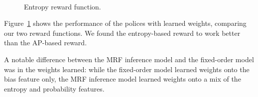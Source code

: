 \begin{figure}[h!]
\centering
{} \\
  \caption{Entropy reward function.}
  \label{fig:results_entropy}
\end{figure}

Figure~\ref{fig:results_entropy} shows the performance of the polices with learned weights, comparing our two reward functions.
We found the entropy-based reward to work better than the AP-based reward.

A notable difference between the MRF inference model and the fixed-order model was in the weights learned: while the fixed-order model learned weights onto the bias feature only, the MRF inference model learned weights onto a mix of the entropy and probability features.